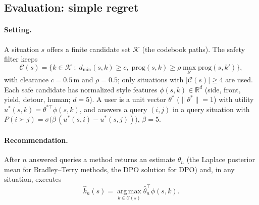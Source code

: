 
\subsection{Evaluation: simple regret}
\label{sec:regret}

\paragraph{Setting.}
A situation $s$ offers a finite candidate set $\mathcal{K}$ (the codebook paths).
The safety filter keeps
\begin{equation}
  \mathcal{C}(s) = \bigl\{ k \in \mathcal{K} \;:\; d_{\min}(s,k) \ge c,\;
  \mathrm{prog}(s,k) \ge \rho \max_{k'} \mathrm{prog}(s,k') \bigr\},
\end{equation}
with clearance $c = 0.5$\,m and $\rho = 0.5$; only situations with $|\mathcal{C}(s)| \ge 4$ are used.
Each safe candidate has normalized style features $\phi(s,k) \in \mathbb{R}^d$
(side, front, yield, detour, human; $d=5$).
A user is a unit vector $\theta^\ast$ ($\lVert\theta^\ast\rVert = 1$) with utility
$u^\ast(s,k) = \theta^{\ast\top}\phi(s,k)$, and answers a query $(i,j)$ in a query situation with
$P(i \succ j) = \sigma\bigl(\beta\,(u^\ast(s,i) - u^\ast(s,j))\bigr)$, $\beta = 5$.

\paragraph{Recommendation.}
After $n$ answered queries a method returns an estimate $\hat\theta_n$
(the Laplace posterior mean for Bradley--Terry methods, the DPO solution for DPO)
and, in any situation, executes
\begin{equation}
  \hat k_n(s) = \operatorname*{arg\,max}_{k \in \mathcal{C}(s)} \hat\theta_n^{\top}\phi(s,k).
\end{equation}

